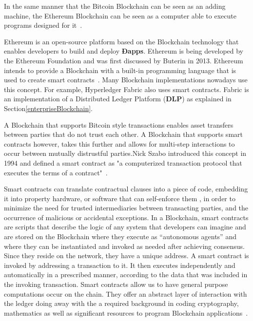 In the same manner that the Bitcoin Blockchain can be seen as an adding
machine, the Ethereum Blockchain can be seen as a computer able to execute
programs designed for it~\cite{Wood2015}.

Ethereum is an open-source platform based on the Blockchain technology that
enables developers to build and deploy \textbf{Ðapps}. Ethereum is being
developed by the Ethereum Foundation and was first discussed by Buterin in
2013. Ethereum intends to provide a Blockchain with a built-in programming
language that is used to create smart contracts~\cite{Wood2017}. Many
Blockchain implementations nowadays use this concept. For example, Hyperledger
Fabric also uses smart contracts. Fabric is an implementation of a Distributed
Ledger Platform (\textbf{DLP}) as explained in
Section\ref{enterpriseBlockchain}.

A Blockchain that supports Bitcoin style transactions enables asset transfers
between parties that do not trust each other. A Blockchain that supports smart
contracts however, takes this further and allows for multi-step interactions to
occur between mutually distrustful parties.Nick Szabo introduced this concept
in 1994 and defined a smart contract as "a computerized transaction protocol
that executes the terms of a contract"~\cite{Christidis2016}. 

Smart contracts can translate contractual clauses into a piece of code,
embedding it into property hardware, or software that can self-enforce them ,
in order to minimize the need for trusted intermediaries between transacting
parties, and the occurrence of malicious or accidental exceptions. In a
Blockchain, smart contracts are scripts that describe the logic of any system
that developers can imagine and are stored on the Blockchain where they execute
as “autonomous agents” and where they can be instantiated and invoked as needed
after achieving consensus.  Since they reside on the network, they have a
unique address. A smart contract is invoked by addressing a transaction to it.
It then executes independently and automatically in a prescribed manner,
according to the data that was included in the invoking transaction. Smart
contracts allow us to have general purpose computations occur on the chain.
They offer an abstract layer of interaction with the ledger doing away with the
a required background in coding cryptography, mathematics as well as
significant resources to program Blockchain
applications~\cite{Wood2017,BlockGeeks2017}.

